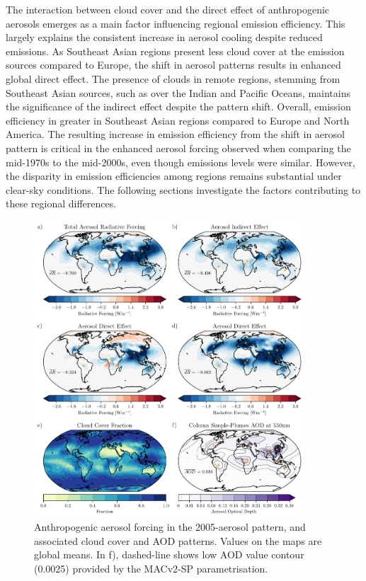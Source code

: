 \documentclass[draft]{agujournal2019}
\begin{document}
            The interaction between cloud cover and the direct effect of anthropogenic aerosols emerges as a main factor influencing regional emission efficiency. This largely explains the consistent increase in aerosol cooling despite reduced emissions. As Southeast Asian regions present less cloud cover at the emission sources compared to Europe, the shift in aerosol patterns results in enhanced global direct effect. The presence of clouds in remote regions, stemming from Southeast Asian sources, such as over the Indian and Pacific Oceans, maintains the significance of the indirect effect despite the pattern shift. Overall, emission efficiency in greater in Southeast Asian regions compared to Europe and North America.
            The resulting increase in emission efficiency from the shift in aerosol pattern is critical in the enhanced aerosol forcing observed when comparing the mid-1970s to the mid-2000s, even though emissions levels were similar.
            However, the disparity in emission efficiencies among regions remains substantial under clear-sky conditions. The following sections investigate the factors contributing to these regional differences.
            
      \begin{figure}
            \centering
            \includegraphics[width=0.9\textwidth]{../../figures/figure3}
            \caption{Anthropogenic aerosol forcing in the 2005-aerosol pattern, and associated cloud cover and AOD patterns. Values on the maps are global means. In f), dashed-line shows low AOD value contour (0.0025) provided by the MACv2-SP parametrisation.}
            \label{fig:maps}
      \end{figure}
\end{document}
